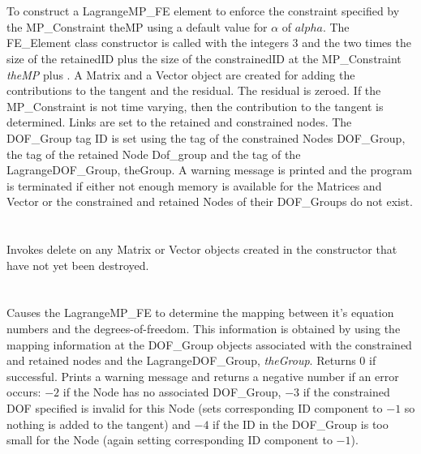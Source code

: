   \\
\\
To construct a LagrangeMP\_FE element to enforce the constraint
specified by the MP\_Constraint \p theMP using a default value for
$\alpha$ of $alpha$. The FE\_Element class constructor is called with
the integers $3$ and the two times the size of the \p retainedID
plus the size of the \p constrainedID at the MP\_Constraint {\em
theMP} plus . A Matrix and a Vector object are created for adding the
contributions to the tangent and the residual. The residual is
zeroed. If the
MP\_Constraint is not time varying, then the contribution to the
tangent is determined. Links are set to the retained and constrained
nodes. The DOF\_Group tag ID is set using the tag of the constrained
Nodes DOF\_Group, the tag of the retained Node Dof\_group and the tag
of the LagrangeDOF\_Group, \p theGroup. A warning message is printed and 
the program is terminated if either not enough memory is available for
the Matrices and Vector or the constrained and retained Nodes of their
DOF\_Groups do not exist. \\



  \\
  \\
Invokes delete on any Matrix or Vector objects created in the
constructor that have not yet been destroyed. \\

  \\
 \\
Causes the LagrangeMP\_FE to determine the mapping between it's equation
numbers and the degrees-of-freedom. This information is obtained by
using the mapping information at the DOF\_Group objects associated with
the constrained and retained nodes and the LagrangeDOF\_Group, {\em
theGroup}. Returns $0$ if
successful. Prints a warning message and returns a negative number if
an error occurs: $-2$ if the
Node has no associated DOF\_Group, $-3$ if the constrained DOF
specified is invalid for this Node (sets corresponding ID component to
$-1$ so nothing is added to the tangent) and $-4$ if the ID in the
DOF\_Group is too small for the Node (again setting corresponding ID
component to $-1$). \\ 

